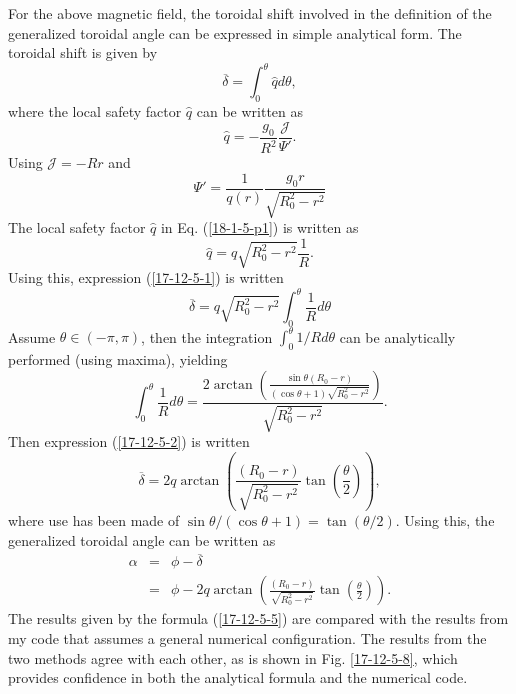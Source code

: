 \documentclass{llncs}
\begin{document}
For the above magnetic field, the toroidal shift involved in the definition of
the generalized toroidal angle can be expressed in simple analytical form. The
toroidal shift is given by
\begin{equation}
  \label{17-12-5-1} \overline{\delta} = \int_0^{\theta} \hat{q} d \theta,
\end{equation}
where the local safety factor $\hat{q}$ can be written as
\begin{equation}
  \label{18-1-5-p1} \hat{q} = - \frac{g_0}{R^2}  \frac{\mathcal{J}}{\Psi'} .
\end{equation}
Using $\mathcal{J} = - R r$ and
\begin{equation}
  \Psi' = \frac{1}{q (r)}  \frac{g_0 r}{\sqrt{R_0^2 - r^2}}
\end{equation}
The local safety factor $\hat{q}$ in Eq. (\ref{18-1-5-p1}) is written as
\begin{equation}
  \label{18-4-30-e1} \hat{q} = q \sqrt{R_0^2 - r^2} \frac{1}{R} .
\end{equation}
Using this, expression (\ref{17-12-5-1}) is written
\begin{equation}
  \label{17-12-5-2} \overline{\delta} = q \sqrt{R_0^2 - r^2} \int_0^{\theta}
  \frac{1}{R} d \theta
\end{equation}
Assume $\theta \in (- \pi, \pi)$, then the integration $\int_0^{\theta} 1 / R
d \theta$ can be analytically performed (using maxima), yielding
\begin{equation}
  \int_0^{\theta} \frac{1}{R} d \theta = \frac{2 \arctan \left( \frac{\sin
  \theta (R_0 - r)}{(\cos \theta + 1) \sqrt{R_0^2 - r^2}} \right)}{\sqrt{R_0^2
  - r^2}} .
\end{equation}
Then expression (\ref{17-12-5-2}) is written
\begin{equation}
  \label{17-12-5-5} \overline{\delta} = 2 q \arctan \left( \frac{(R_0 -
  r)}{\sqrt{R_0^2 - r^2}} \tan \left( \frac{\theta}{2} \right) \right),
\end{equation}
where use has been made of $\sin \theta / (\cos \theta + 1) = \tan (\theta /
2)$. Using this, the generalized toroidal angle can be written as
\begin{eqnarray}
  \alpha & = & \phi - \overline{\delta} \nonumber\\
  & = & \phi - 2 q \arctan \left( \frac{(R_0 - r)}{\sqrt{R_0^2 - r^2}} \tan
  \left( \frac{\theta}{2} \right) \right) .  \label{18-9-11-a1}
\end{eqnarray}
The results given by the formula (\ref{17-12-5-5}) are compared with the
results from my code that assumes a general numerical configuration. The
results from the two methods agree with each other, as is shown in Fig.
\ref{17-12-5-8}, which provides confidence in both the analytical formula and
the numerical code.
\end{document}
